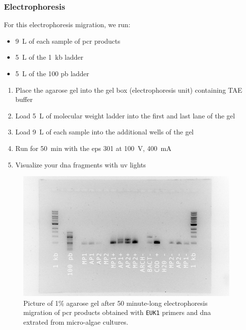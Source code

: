 
\subsubsection{Electrophoresis}

For this electrophoresis migration, we run:
\begin{itemize}
\item 9~\textmu L of each sample of \gls{pcr} products
\item 5~\textmu L of the 1~kb ladder
\item 5~\textmu L of the 100 pb ladder
\end{itemize}

\begin{enumerate}
\item Place the agarose gel into the gel box (electrophoresis unit) containing TAE buffer
\item Load 5~\textmu L of molecular weight ladder into the first and last lane of the gel
\item Load 9~\textmu L of each sample into the additional wells of the gel
\item Run for 50~min with the \gls{eps} 301 at 100~V, 400~mA
\item Visualize your \gls{dna} fragments with \gls{uv} lights
\end{enumerate}


\begin{figure}[H] %
    \centering
    \caption{Picture of 1\% agarose gel after 50 minute-long electrophoresis migration of \gls{pcr} products obtained with \texttt{EUK1} primers and \gls{dna} extrated from micro-algae cultures.}
    \label{fig:20180218_EUK1_OneTaq_MasterPure_vs_AllPrep}
    \includegraphics[width=\textwidth]{graphics/pic/20180218_EUK1_OneTaq_MasterPure_vs_AllPrep.png}
\end{figure}
